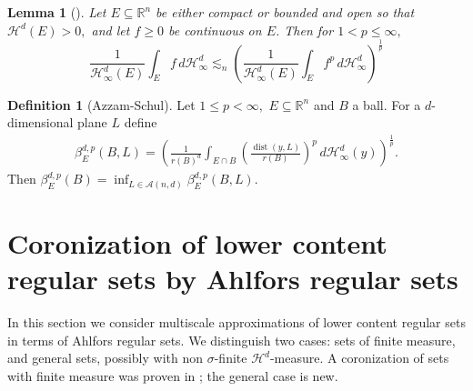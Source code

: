 \documentclass[11pt,reqno]{amsart}
\def\dA{{\mathcal{A}}}
\def\dist{\mathop\mathrm{dist}} 						%
\newtheorem{lemma}[theorem]{Lemma}
\theoremstyle{definition}
\newtheorem{definition}[theorem]{Definition}
\theoremstyle{remark}
\numberwithin{equation}{section}
\newcommand{\R}{\mathbb{R}}
\newcommand{\hd}{\mathcal{H}^d}
\theoremstyle{theorem}
\theoremstyle{definition}
\theoremstyle{remark}
\numberwithin{equation}{section}
\begin{document}
	\begin{lemma}[{\cite[Lemma 2.3]{azzam2018analyst}}]\label{l:jensen}
		Let $E \subseteq \R^n$ be either compact or bounded and open so that $\hd(E) >0,$ and let $f \geq 0$ be continuous on $E$. Then for $1 < p \leq \infty,$
		\[ \frac{1}{\hd_\infty(E)} \int_E f \, d\hd_\infty \lesssim_n \left( \frac{1}{\hd_\infty(E)} \int_E f^p \, d\hd_\infty \right)^\frac{1}{p} \] 
	\end{lemma}
	\begin{definition}[Azzam-Schul]\label{d:content-beta}
		Let $1 \leq p < \infty,$ $E \subseteq \R^n$ and $B$ a ball. For a $d$-dimensional plane $L$ define
		\begin{align} \label{e:beta-content} \beta^{d,p}_E(B,L) = \left( \frac{1}{r(B)^d} \int_{E \cap B} \left( \frac{\dist(y,L)}{r(B)} \right)^p \, d\mathcal{H}^d_\infty(y) \right)^\frac{1}{p}.
		\end{align}
		Then $\beta_{E}^{d,p}(B) = \inf_{L\in \dA(n,d)} \beta_{E}^{d,p}(B,L)$. 
	\end{definition}



\section{Coronization of lower content regular sets by Ahlfors regular sets}\label{s:coronization}
In this section we consider multiscale approximations of lower content regular sets in terms of Ahlfors regular sets. We distinguish two cases: sets of finite measure, and general sets, possibly with non $\sigma$-finite $\mathcal{H}^d$-measure. A coronization of sets with finite measure was proven in \cite{azzam2019quantitative}; the general case is new. %
\end{document}
